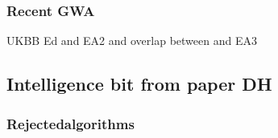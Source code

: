 \subsubsection{Recent GWA}
UKBB Ed and EA2 and overlap between and EA3


\subsection{Intelligence bit from paper DH}
\label{sec:Introduction intelligence bit from paper david hill}


\subsubsection{Rejectedalgorithms}



